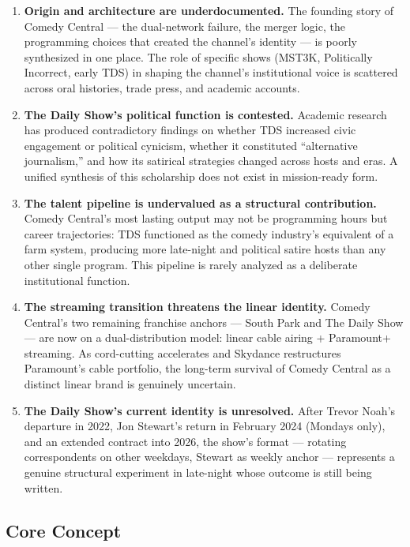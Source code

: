 \documentclass[11pt,letterpaper]{article}
\begin{document}
\begin{enumerate}
  \item \textbf{Origin and architecture are underdocumented.} The founding story of Comedy Central --- the dual-network failure, the merger logic, the programming choices that created the channel's identity --- is poorly synthesized in one place. The role of specific shows (MST3K, Politically Incorrect, early TDS) in shaping the channel's institutional voice is scattered across oral histories, trade press, and academic accounts.

  \item \textbf{The Daily Show's political function is contested.} Academic research has produced contradictory findings on whether TDS increased civic engagement or political cynicism, whether it constituted ``alternative journalism,'' and how its satirical strategies changed across hosts and eras. A unified synthesis of this scholarship does not exist in mission-ready form.

  \item \textbf{The talent pipeline is undervalued as a structural contribution.} Comedy Central's most lasting output may not be programming hours but career trajectories: TDS functioned as the comedy industry's equivalent of a farm system, producing more late-night and political satire hosts than any other single program. This pipeline is rarely analyzed as a deliberate institutional function.

  \item \textbf{The streaming transition threatens the linear identity.} Comedy Central's two remaining franchise anchors --- South Park and The Daily Show --- are now on a dual-distribution model: linear cable airing + Paramount+ streaming. As cord-cutting accelerates and Skydance restructures Paramount's cable portfolio, the long-term survival of Comedy Central as a distinct linear brand is genuinely uncertain.

  \item \textbf{The Daily Show's current identity is unresolved.} After Trevor Noah's departure in 2022, Jon Stewart's return in February 2024 (Mondays only), and an extended contract into 2026, the show's format --- rotating correspondents on other weekdays, Stewart as weekly anchor --- represents a genuine structural experiment in late-night whose outcome is still being written.
\end{enumerate}

\subsection{Core Concept}
\end{document}
